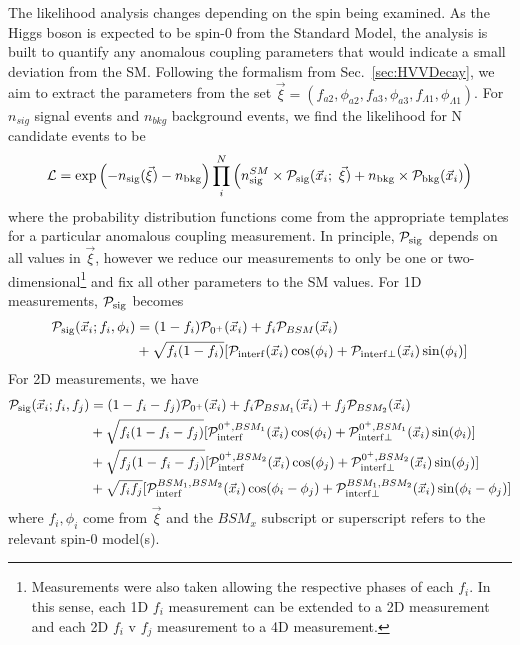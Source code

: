 The likelihood analysis changes depending on the spin being examined. As the Higgs boson is expected to be spin-0 from the Standard Model, the analysis is built to quantify any anomalous coupling parameters that would indicate a small deviation from the SM. Following the formalism from Sec.~\ref{sec:HVVDecay}, we aim to extract the parameters from the set $\vec{\xi} = (f_{a2}, \phi_{a2}, f_{a3}, \phi_{a3},f_{\Lambda 1}, \phi_{\Lambda 1})$. For $n_{sig}$ signal events and $n_{bkg}$ background events, we find the likelihood for N candidate events to be
\begin{equation}
{{\mathcal{L}}} =  \exp\left( - n_{\rm sig}(\vec{\xi})-n_{\rm bkg}  \right) \prod_i^{N} \left( n^{SM}_{\rm sig} \times{\mathcal{P}}_{\rm sig}(\vec{x}_{i};~\vec{\xi})  +n_{\rm bkg} \times{\mathcal{P}}_{\rm bkg}(\vec{x}_{i}) \right)
\end{equation}
where the probability distribution functions come from the appropriate templates for a particular anomalous coupling measurement. In principle, ${\mathcal{P}}_{\rm sig}$ depends on all values in $\vec{\xi}$, however we reduce our measurements to only be one or two-dimensional\footnote{Measurements were also taken allowing the respective phases of each $f_{i}$. In this sense, each 1D $f_{i}$ measurement can be extended to a 2D measurement and each 2D $f_{i}$ v $f_{j}$ measurement to a 4D measurement.} and fix all other parameters to the SM values. For 1D measurements, ${\mathcal{P}}_{\rm sig}$ becomes
\begin{equation}
\begin{split}
{\mathcal{P}}_{\rm sig}(\vec{x}_i;f_{i},\phi_{i}) &= (1-f_i) \mathcal{P}_{0^+}(\vec{x}_i) + f_{i} \mathcal{P}_{BSM}(\vec{x}_i) \\ &+\sqrt{f_i (1-f_i)}[\mathcal{P}_{\rm interf}(\vec{x}_i)\cos(\phi_i) + \mathcal{P}_{\rm interf \perp}(\vec{x}_i)\sin(\phi_i)]
\end{split}
\end{equation}
For 2D measurements, we have
\begin{equation}
\begin{split}
{\mathcal{P}}_{\rm sig}(\vec{x}_i;f_{i},f_{j}) &= (1-f_i-f_j) \mathcal{P}_{0^+}(\vec{x}_i) + f_{i} \mathcal{P}_{BSM_1}(\vec{x}_i) + f_{j} \mathcal{P}_{BSM_2}(\vec{x}_i)\\ &+\sqrt{f_i (1-f_i-f_j)}[\mathcal{P}_{\rm interf}^{0^+,BSM_1}(\vec{x}_i)\cos(\phi_i) + \mathcal{P}_{\rm interf \perp}^{0^+,BSM_1}(\vec{x}_i)\sin(\phi_i)] \\
& + \sqrt{f_j (1-f_i-f_j)}[\mathcal{P}_{\rm interf}^{0^+,BSM_2}(\vec{x}_i)\cos(\phi_j) + \mathcal{P}_{\rm interf \perp}^{0^+,BSM_2}(\vec{x}_i)\sin(\phi_j)] \\
& + \sqrt{f_if_j}[\mathcal{P}_{\rm interf}^{BSM_1,BSM_2}(\vec{x}_i)\cos(\phi_i-\phi_j) + \mathcal{P}_{\rm interf \perp}^{BSM_1,BSM_2}(\vec{x}_i)\sin(\phi_i - \phi_j)]
\end{split}
\end{equation}
where $f_i,\phi_i$ come from $\vec{\xi}$ and the $BSM_x$ subscript or superscript refers to the relevant spin-0 model(s).

